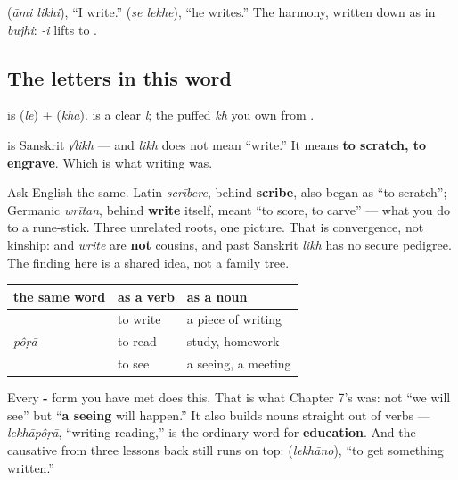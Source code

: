   (\emph{āmi likhi}), \textquotedblleft{}I write.\textquotedblright{}   (\emph{se lekhe}), \textquotedblleft{}he writes.\textquotedblright{} The harmony, written down as in \emph{bujhi}: \emph{-i} lifts \textbf{} to \textbf{}.

\subsection*{The letters in this word}
\textbf{} is \textbf{} (\emph{le}) + \textbf{} (\emph{khā}). \textbf{} is a clear \emph{l}; \textbf{} the puffed \emph{kh} you own from .

\begin{cousinweb}
\textbf{} is Sanskrit \emph{√likh} — and \emph{likh} does not mean \textquotedblleft{}write.\textquotedblright{} It means \textbf{to scratch, to engrave}. Which is what writing was.

Ask English the same. Latin \emph{scrībere}, behind \textbf{scribe}, also began as \textquotedblleft{}to scratch\textquotedblright{}; Germanic \emph{wrītan}, behind \textbf{write} itself, meant \textquotedblleft{}to score, to carve\textquotedblright{} — what you do to a rune-stick. Three unrelated roots, one picture. That is convergence, not kinship:  and \emph{write} are \textbf{not} cousins, and past Sanskrit \emph{likh} has no secure pedigree. The finding here is a shared idea, not a family tree.
\end{cousinweb}

\begin{grammarlens}[title={Grammar Lens: the dictionary form is also a noun}]
\noindent
\begin{tabularx}{\linewidth}{@{}>{\raggedright\arraybackslash}X>{\raggedright\arraybackslash}X>{\raggedright\arraybackslash}X@{}}
\toprule
\textbf{the same word} & \textbf{as a verb} & \textbf{as a noun} \\
\midrule
\bn{লেখা} & to write & a piece of writing \\
\emph{pôṛā} & to read & study, homework \\
\bn{দেখা} & to see & a seeing, a meeting \\
\bottomrule
\end{tabularx}

Every \textbf{-} form you have met does this. That is what Chapter 7's \textbf{ } was: not \textquotedblleft{}we will see\textquotedblright{} but \textquotedblleft{}\textbf{a seeing} will happen.\textquotedblright{} It also builds nouns straight out of verbs — \emph{lekhāpôṛā}, \textquotedblleft{}writing-reading,\textquotedblright{} is the ordinary word for \textbf{education}. And the causative from three lessons back still runs on top: \textbf{} (\emph{lekhāno}), \textquotedblleft{}to get something written.\textquotedblright{}
\end{grammarlens}

